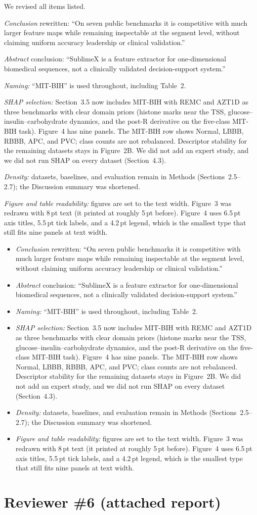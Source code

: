 \documentclass[11pt]{article}
\makeatletter
\newcommand{\rsp}{\par\vspace{0.9em}}
\newcommand{\response}[2]{%
  \begin{responsebox}#1%
  \def\@responseitems{#2}%
  \ifx\@responseitems\empty\else\begin{itemize}[nosep,leftmargin=1.2em]#2\end{itemize}\fi
  \end{responsebox}\rsp}
\makeatother
\begin{document}
\response{We revised all items listed.}{
  \item \emph{Conclusion} rewritten: ``On seven public benchmarks it is competitive with much larger
    feature maps while remaining inspectable at the segment level, without claiming uniform accuracy
    leadership or clinical validation.''
  \item \emph{Abstract} conclusion: ``SublimeX is a feature extractor for one-dimensional biomedical
    sequences, not a clinically validated decision-support system.''
  \item \emph{Naming:} ``MIT-BIH'' is used throughout, including Table~2.
  \item \emph{SHAP selection:} Section~3.5 now includes MIT-BIH with REMC and AZT1D as three
    benchmarks with clear domain priors (histone marks near the TSS, glucose--insulin--carbohydrate
    dynamics, and the post-R derivative on the five-class MIT-BIH task). Figure~4 has nine panels.
    The MIT-BIH row shows Normal, LBBB, RBBB, APC, and PVC; class counts are not rebalanced.
    Descriptor stability for the remaining datasets stays in Figure~2B. We did not add an expert
    study, and we did not run SHAP on every dataset (Section~4.3).
  \item \emph{Density:} datasets, baselines, and evaluation remain in Methods (Sections~2.5--2.7); the Discussion
    summary was shortened.
  \item \emph{Figure and table readability:} figures are set to the text width. Figure~3 was redrawn
    with 8\,pt text (it printed at roughly 5\,pt before). Figure~4 uses 6.5\,pt axis titles,
    5.5\,pt tick labels, and a 4.2\,pt legend, which is the smallest type that still fits nine
    panels at text width.
}

\section*{Reviewer \#6 (attached report)}
\end{document}

